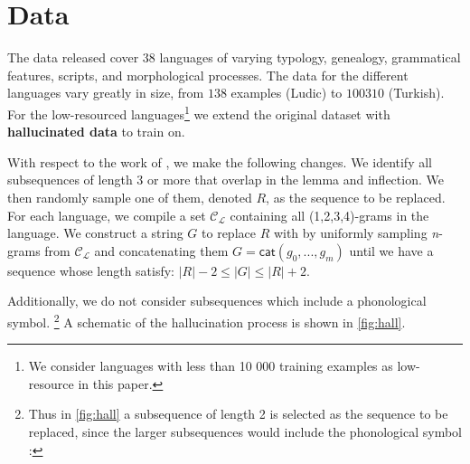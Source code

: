 \documentclass[11pt,a4paper]{article}
\begin{document}

\section{Data}

The data released cover $38$ languages of varying typology, genealogy,
grammatical features, scripts, and morphological processes. The data
for the different languages vary greatly in size, from $138$ examples
(Ludic) to $100310$ (Turkish).  For the low-resourced
languages\footnote{We consider languages with less than 10 000
training examples as low-resource in this paper.} we extend the
original dataset with \textbf{hallucinated data}
\cite{DBLP:conf/emnlp/AnastasopoulosN19} to train on.

With respect to the work of \citet{DBLP:conf/emnlp/AnastasopoulosN19},
we make the following changes. We identify all subsequences of length
$3$ or more that overlap in the lemma and inflection. We then randomly
sample one of them, denoted $R$, as the sequence to be replaced.  For
each language, we compile a set $\mathcal{C_L}$ containing all
(1,2,3,4)-grams in the language. We construct a string $G$ to replace
$R$ with by uniformly sampling \textit{n}-grams from $\mathcal{C_L}$
and concatenating them $G = \mathsf{cat}(g_0, ..., g_m)$ until we have
a sequence whose length satisfy: $|R|-2 \leq |G| \leq |R|+2$.



Additionally, we do not consider subsequences which include a
phonological symbol. \footnote{Thus in \cref{fig:hall} a subsequence of
length 2 is selected as the sequence to be replaced, since the larger subsequences
would include the phonological symbol :}  A schematic of the hallucination
process is shown in \cref{fig:hall}.
\end{document}
